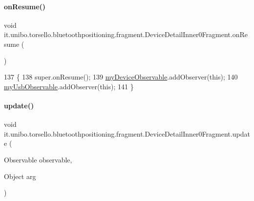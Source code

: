 \paragraph{\texorpdfstring{on\+Resume()}{onResume()}}
{\footnotesize\ttfamily void it.\+unibo.\+torsello.\+bluetoothpositioning.\+fragment.\+Device\+Detail\+Inner0\+Fragment.\+on\+Resume (\begin{DoxyParamCaption}{ }\end{DoxyParamCaption})}


\begin{DoxyCode}
137                            \{
138         super.onResume();
139         \hyperlink{classit_1_1unibo_1_1torsello_1_1bluetoothpositioning_1_1fragment_1_1DeviceDetailInner0Fragment_a089c88571cc867a1313163ed0726ebd0_a089c88571cc867a1313163ed0726ebd0}{myDeviceObservable}.addObserver(\textcolor{keyword}{this});
140         \hyperlink{classit_1_1unibo_1_1torsello_1_1bluetoothpositioning_1_1fragment_1_1DeviceDetailInner0Fragment_aaf0094eb7714c43970243c17124fdc3b_aaf0094eb7714c43970243c17124fdc3b}{myUsbObservable}.addObserver(\textcolor{keyword}{this});
141     \}
\end{DoxyCode}
\hypertarget{classit_1_1unibo_1_1torsello_1_1bluetoothpositioning_1_1fragment_1_1DeviceDetailInner0Fragment_aa80acc0e82730a27b0085e5da3087d20_aa80acc0e82730a27b0085e5da3087d20}{}\label{classit_1_1unibo_1_1torsello_1_1bluetoothpositioning_1_1fragment_1_1DeviceDetailInner0Fragment_aa80acc0e82730a27b0085e5da3087d20_aa80acc0e82730a27b0085e5da3087d20} 
\paragraph{\texorpdfstring{update()}{update()}}
{\footnotesize\ttfamily void it.\+unibo.\+torsello.\+bluetoothpositioning.\+fragment.\+Device\+Detail\+Inner0\+Fragment.\+update (\begin{DoxyParamCaption}\item[{Observable}]{observable,  }\item[{Object}]{arg }\end{DoxyParamCaption})}


